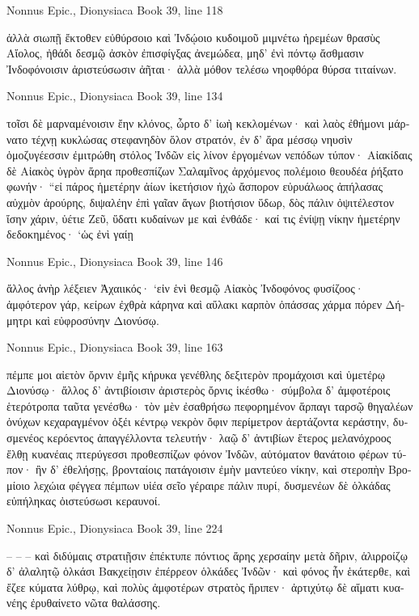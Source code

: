 \documentclass[12pt,letterpaper,twoside,final]{memoir}
\begin{document}
\begin{greek}
Nonnus Epic., Dionysiaca 
Book 39, line 118

                                           ἀλλὰ σιωπῇ 
ἔκτοθεν εὐθύρσοιο καὶ Ἰνδῴοιο κυδοιμοῦ 
μιμνέτω ἠρεμέων θρασὺς Αἴολος, ἠθάδι δεσμῷ 
ἀσκὸν ἐπισφίγξας ἀνεμώδεα, μηδ' ἐνὶ πόντῳ 
ἄσθμασιν Ἰνδοφόνοισιν ἀριστεύσωσιν ἀῆται· 
ἀλλὰ μόθον τελέσω νηοφθόρα θύρσα τιταίνων. 



Nonnus Epic., Dionysiaca 
Book 39, line 134

τοῖσι δὲ μαρναμένοισιν ἔην κλόνος, ὦρτο δ' ἰωὴ 
κεκλομένων· καὶ λαὸς ἐθήμονι μάρνατο τέχνῃ 
κυκλώσας στεφανηδὸν ὅλον στρατόν, ἐν δ' ἄρα μέσσῳ 
νηυσὶν ὁμοζυγέεσσιν ἐμιτρώθη στόλος Ἰνδῶν 
εἰς λίνον ἐργομένων νεπόδων τύπον· Αἰακίδαις δὲ 
Αἰακὸς ὑγρὸν ἄρηα προθεσπίζων Σαλαμῖνος 
ἀρχόμενος πολέμοιο θεουδέα ῥήξατο φωνήν· 
 “εἰ πάρος ἡμετέρην ἀίων ἱκετήσιον ἠχὼ 
ἄσπορον εὐρυάλωος ἀπήλασας αὐχμὸν ἀρούρης, 
διψαλέην ἐπὶ γαῖαν ἄγων βιοτήσιον ὕδωρ, 
δὸς πάλιν ὀψιτέλεστον ἴσην χάριν, ὑέτιε Ζεῦ, 
ὕδατι κυδαίνων με καὶ ἐνθάδε· καί τις ἐνίψῃ 
νίκην ἡμετέρην δεδοκημένος· ‘ὡς ἐνὶ γαίῃ 




Nonnus Epic., Dionysiaca 
Book 39, line 146

ἄλλος ἀνὴρ λέξειεν Ἀχαιικός· ‘εἰν ἑνὶ θεσμῷ 
Αἰακὸς Ἰνδοφόνος φυσίζοος· ἀμφότερον γάρ, 
κείρων ἐχθρὰ κάρηνα καὶ αὔλακι καρπὸν ὀπάσσας 
χάρμα πόρεν Δήμητρι καὶ εὐφροσύνην Διονύσῳ. 



Nonnus Epic., Dionysiaca 
Book 39, line 163

πέμπε μοι αἰετὸν ὄρνιν ἐμῆς κήρυκα γενέθλης 
δεξιτερὸν προμάχοισι καὶ ὑμετέρῳ Διονύσῳ· 
ἄλλος δ' ἀντιβίοισιν ἀριστερὸς ὄρνις ἱκέσθω· 
σύμβολα δ' ἀμφοτέροις ἑτερότροπα ταῦτα γενέσθω· 
τὸν μὲν ἐσαθρήσω πεφορημένον ἅρπαγι ταρσῷ 
θηγαλέων ὀνύχων κεχαραγμένον ὀξέι κέντρῳ 
νεκρὸν ὄφιν περίμετρον ἀερτάζοντα κεράστην, 
δυσμενέος κερόεντος ἀπαγγέλλοντα τελευτήν· 
λαῷ δ' ἀντιβίων ἕτερος μελανόχροος ἔλθῃ 
κυανέαις πτερύγεσσι προθεσπίζων φόνον Ἰνδῶν, 
αὐτόματον θανάτοιο φέρων τύπον· ἢν δ' ἐθελήσῃς, 
βρονταίοις πατάγοισιν ἐμὴν μαντεύεο νίκην, 
καὶ στεροπὴν Βρομίοιο λεχώια φέγγεα πέμπων 
υἱέα σεῖο γέραιρε πάλιν πυρί, δυσμενέων δὲ 
ὁλκάδας εὐπήληκας ὀιστεύσωσι κεραυνοί. 



Nonnus Epic., Dionysiaca 
Book 39, line 224

        –   –   –  
 καὶ διδύμαις στρατιῇσιν ἐπέκτυπε πόντιος ἄρης   
χερσαίην μετὰ δῆριν, ἁλιρροίζῳ δ' ἀλαλητῷ 
ὁλκάσι Βακχείῃσιν ἐπέρρεον ὁλκάδες Ἰνδῶν· 
καὶ φόνος ἦν ἑκάτερθε, καὶ ἔζεε κύματα λύθρῳ, 
καὶ πολὺς ἀμφοτέρων στρατὸς ἤριπεν· ἀρτιχύτῳ δὲ 
αἵματι κυανέης ἐρυθαίνετο νῶτα θαλάσσης. 




\end{greek}
\end{document}
